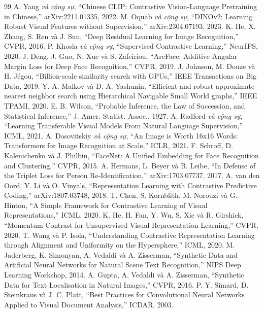 \documentclass[conference,a4paper]{IEEEtran}
\begin{document}
\begin{thebibliography}{99}
 A. Yang \emph{và cộng sự}, ``Chinese CLIP: Contrastive Vision-Language
Pretraining in Chinese,'' arXiv:2211.01335, 2022.
 M. Oquab \emph{và cộng sự}, ``DINOv2: Learning Robust Visual Features without
Supervision,'' arXiv:2304.07193, 2023.
 K. He, X. Zhang, S. Ren và J. Sun, ``Deep Residual Learning for Image
Recognition,'' CVPR, 2016.
 P. Khosla \emph{và cộng sự}, ``Supervised Contrastive Learning,'' NeurIPS, 2020.
 J. Deng, J. Guo, N. Xue và S. Zafeiriou, ``ArcFace: Additive Angular Margin Loss
for Deep Face Recognition,'' CVPR, 2019.
 J. Johnson, M. Douze và H. Jégou, ``Billion-scale similarity search with GPUs,''
IEEE Transactions on Big Data, 2019.
 Y. A. Malkov và D. A. Yashunin, ``Efficient and robust approximate nearest neighbor
search using Hierarchical Navigable Small World graphs,'' IEEE TPAMI, 2020.
 E. B. Wilson, ``Probable Inference, the Law of Succession, and Statistical
Inference,'' J. Amer. Statist. Assoc., 1927.
 A. Radford \emph{và cộng sự}, ``Learning Transferable Visual Models From
Natural Language Supervision,'' ICML, 2021.
 A. Dosovitskiy \emph{và cộng sự}, ``An Image is Worth 16x16 Words: Transformers for
Image Recognition at Scale,'' ICLR, 2021.
 F. Schroff, D. Kalenichenko và J. Philbin, ``FaceNet: A Unified Embedding for Face
Recognition and Clustering,'' CVPR, 2015.
 A. Hermans, L. Beyer và B. Leibe, ``In Defense of the Triplet Loss for Person
Re-Identification,'' arXiv:1703.07737, 2017.
 A. van den Oord, Y. Li và O. Vinyals, ``Representation Learning with Contrastive
Predictive Coding,'' arXiv:1807.03748, 2018.
 T. Chen, S. Kornblith, M. Norouzi và G. Hinton, ``A Simple Framework for Contrastive
Learning of Visual Representations,'' ICML, 2020.
 K. He, H. Fan, Y. Wu, S. Xie và R. Girshick, ``Momentum Contrast for Unsupervised
Visual Representation Learning,'' CVPR, 2020.
 T. Wang và P. Isola, ``Understanding Contrastive Representation Learning
through Alignment and Uniformity on the Hypersphere,'' ICML, 2020.
 M. Jaderberg, K. Simonyan, A. Vedaldi và A. Zisserman, ``Synthetic Data and
Artificial Neural Networks for Natural Scene Text Recognition,'' NIPS Deep Learning Workshop, 2014.
 A. Gupta, A. Vedaldi và A. Zisserman, ``Synthetic Data for Text Localisation in
Natural Images,'' CVPR, 2016.
 P. Y. Simard, D. Steinkraus và J. C. Platt, ``Best Practices for Convolutional
Neural Networks Applied to Visual Document Analysis,'' ICDAR, 2003.

\end{thebibliography}
\end{document}

